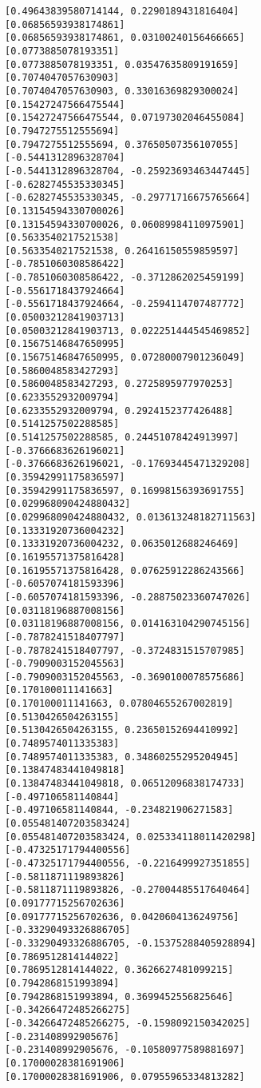 \documentclass[11pt]{article}
\begin{document}
\begin{Verbatim}[commandchars=\\\{\}]
[0.49643839580714144, 0.2290189431816404]
[0.06856593938174861]
[0.06856593938174861, 0.03100240156466665]
[0.0773885078193351]
[0.0773885078193351, 0.03547635809191659]
[0.7074047057630903]
[0.7074047057630903, 0.33016369829300024]
[0.15427247566475544]
[0.15427247566475544, 0.07197302046455084]
[0.7947275512555694]
[0.7947275512555694, 0.37650507356107055]
[-0.5441312896328704]
[-0.5441312896328704, -0.25923693463447445]
[-0.6282745535330345]
[-0.6282745535330345, -0.29771716675765664]
[0.13154594330700026]
[0.13154594330700026, 0.06089984110975901]
[0.5633540217521538]
[0.5633540217521538, 0.26416150559859597]
[-0.7851060308586422]
[-0.7851060308586422, -0.3712862025459199]
[-0.5561718437924664]
[-0.5561718437924664, -0.2594114707487772]
[0.05003212841903713]
[0.05003212841903713, 0.022251444545469852]
[0.15675146847650995]
[0.15675146847650995, 0.07280007901236049]
[0.5860048583427293]
[0.5860048583427293, 0.2725895977970253]
[0.6233552932009794]
[0.6233552932009794, 0.2924152377426488]
[0.5141257502288585]
[0.5141257502288585, 0.24451078424913997]
[-0.3766683626196021]
[-0.3766683626196021, -0.17693445471329208]
[0.35942991175836597]
[0.35942991175836597, 0.16998156393691755]
[0.029968090424880432]
[0.029968090424880432, 0.013613248182711563]
[0.13331920736004232]
[0.13331920736004232, 0.0635012688246469]
[0.16195571375816428]
[0.16195571375816428, 0.07625912286243566]
[-0.6057074181593396]
[-0.6057074181593396, -0.28875023360747026]
[0.03118196887008156]
[0.03118196887008156, 0.014163104290745156]
[-0.7878241518407797]
[-0.7878241518407797, -0.3724831515707985]
[-0.7909003152045563]
[-0.7909003152045563, -0.3690100078575686]
[0.170100011141663]
[0.170100011141663, 0.07804655267002819]
[0.5130426504263155]
[0.5130426504263155, 0.23650152694410992]
[0.7489574011335383]
[0.7489574011335383, 0.34860255295204945]
[0.13847483441049818]
[0.13847483441049818, 0.06512096838174733]
[-0.497106581140844]
[-0.497106581140844, -0.234821906271583]
[0.055481407203583424]
[0.055481407203583424, 0.025334118011420298]
[-0.47325171794400556]
[-0.47325171794400556, -0.2216499927351855]
[-0.5811871119893826]
[-0.5811871119893826, -0.27004485517640464]
[0.09177715256702636]
[0.09177715256702636, 0.0420604136249756]
[-0.33290493326886705]
[-0.33290493326886705, -0.15375288405928894]
[0.7869512814144022]
[0.7869512814144022, 0.3626627481099215]
[0.7942868151993894]
[0.7942868151993894, 0.3699452556825646]
[-0.34266472485266275]
[-0.34266472485266275, -0.1598092150342025]
[-0.231408992905676]
[-0.231408992905676, -0.10580977589881697]
[0.17000028381691906]
[0.17000028381691906, 0.07955965334813282]

\end{Verbatim}
\end{document}
